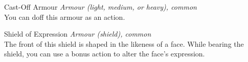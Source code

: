 \begingroup
	\DndSetThemeColor[PhbLightGreen]
	\begin{DndComment}{Cast-Off Armour}
		\textit{Armour (light, medium, or heavy), common}\\
		You can doff this armour as an action.
	\end{DndComment}
	\begin{DndComment}{Shield of Expression}
		\textit{Armour (shield), common}\\
		The front of this shield is shaped in the likeness of a face. While bearing the shield, you can use a bonus action to alter the face's expression.
	\end{DndComment}
\endgroup





